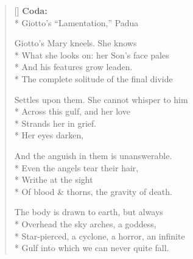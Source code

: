 \begin{verse}[\versewidth]
\textbf{Coda:}\\*
Giotto's ``Lamentation,'' Padua

Giotto's Mary kneels. She knows\\*
What she looks on: her Son's face pales\\*
And his features grow leaden.\\*
The complete solitude of the final divide

Settles upon them. She cannot whisper to him\\*
Across this gulf, and her love\\*
Strands her in grief.\\*
Her eyes darken,

And the anguish in them is unanswerable.\\*
Even the angels tear their hair,\\*
Writhe at the sight\\*
Of blood \& thorns, the gravity of death.

The body is drawn to earth, but always\\*
Overhead the sky arches, a goddess,\\*
Star-pierced, a cyclone, a horror, an infinite\\*
Gulf into which we can never quite fall.
\end{verse}
